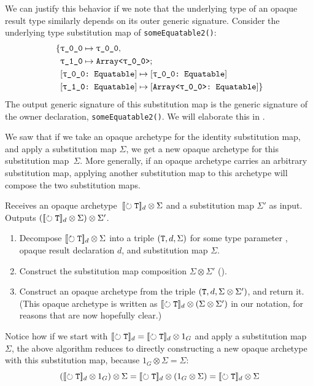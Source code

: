 \documentclass[../generics]{subfiles}
\begin{document}
\begin{example}
We can justify this behavior if we note that the underlying type of an opaque result type similarly depends on its outer generic signature. Consider the underlying type substitution map of \texttt{someEquatable2()}:
\begin{align*}
\SubstMapC{
&\SubstType{\rT}{\rT},\\
&\SubstType{\rO}{Array<\rT>}
}{\\
&\SubstConf{\rT}{\rT}{Equatable}\\
&\SubstConf{\rO}{Array<\rT>}{Equatable}
}
\end{align*}
The output generic signature of this substitution map is the generic signature of the owner declaration, \texttt{someEquatable2()}. We will elaborate this in .
\end{example}

We saw that if we take an opaque archetype for the identity substitution map, and apply a substitution map $\Sigma$, we get a new opaque archetype for this substitution map~$\Sigma$. More generally, if an opaque archetype carries an arbitrary substitution map, applying another substitution map to this archetype will compose the two substitution maps.

\begin{algorithm}\label{alg:substitute opaque archetype}
Receives an opaque archetype~$[\![\circlearrowright \texttt{T}]\!]_d \otimes \Sigma$ and a substitution map $\Sigma'$ as input. Outputs $([\![\circlearrowright \texttt{\texttt{T}}]\!]_d\otimes\Sigma)\otimes\Sigma'$.
\begin{enumerate}
\item Decompose $[\![\circlearrowright \texttt{\texttt{T}}]\!]_d \otimes \Sigma$ into a triple $(\texttt{T}, d, \Sigma)$ for some type parameter \tT, opaque result declaration $d$, and substitution map $\Sigma$.
\item Construct the substitution map composition $\Sigma \otimes \Sigma'$ ().
\item Construct an opaque archetype from the triple $(\texttt{T}, d, \Sigma\otimes\Sigma')$, and return it. (This opaque archetype is written as $[\![\circlearrowright \texttt{\texttt{T}}]\!]_d \otimes (\Sigma\otimes\Sigma')$ in our notation, for reasons that are now hopefully clear.)
\end{enumerate}
\end{algorithm}
Notice how if we start with $[\![\circlearrowright \texttt{\texttt{T}}]\!]_d = [\![\circlearrowright \texttt{\texttt{T}}]\!]_d\otimes 1_G$ and apply a substitution map~$\Sigma$, the above algorithm reduces to directly constructing a new opaque archetype with this substitution map, because $1_G \otimes \Sigma = \Sigma$:
\[
([\![\circlearrowright \texttt{\texttt{T}}]\!]_d\otimes 1_G) \otimes \Sigma = [\![\circlearrowright \texttt{\texttt{T}}]\!]_d\otimes (1_G \otimes \Sigma)=[\![\circlearrowright \texttt{\texttt{T}}]\!]_d\otimes \Sigma
\]
\end{document}
